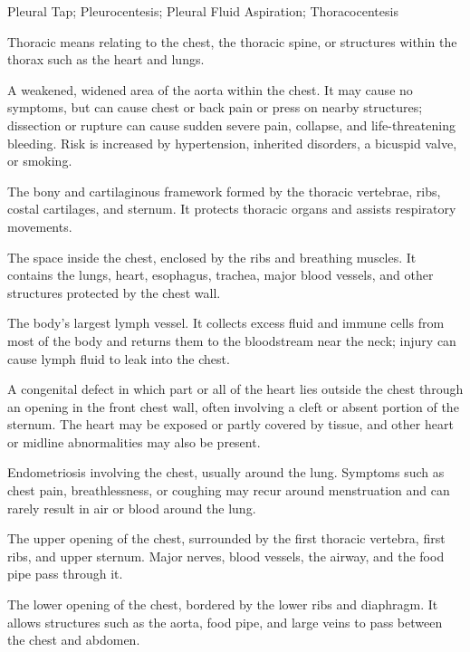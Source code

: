\synonyms
Pleural Tap; Pleurocentesis; Pleural Fluid Aspiration; Thoracocentesis

 Thoracic means relating to the chest, the thoracic spine, or structures within the thorax such as the heart and lungs.

 A weakened, widened area of the aorta within the chest. It may cause no symptoms, but can cause chest or back pain or press on nearby structures; dissection or rupture can cause sudden severe pain, collapse, and life-threatening bleeding. Risk is increased by hypertension, inherited disorders, a bicuspid valve, or smoking.

 The bony and cartilaginous framework formed by the thoracic vertebrae, ribs, costal
cartilages, and sternum. It protects thoracic organs and assists respiratory movements.

 The space inside the chest, enclosed by the ribs and breathing muscles. It contains the lungs, heart, esophagus, trachea, major blood vessels, and other structures protected by the chest wall.

 The body’s largest lymph vessel. It collects excess fluid and immune cells from most of the body and returns them to the bloodstream near the neck; injury can cause lymph fluid to leak into the chest.

 A congenital defect in which part or all of the heart lies outside the chest through an opening in the front chest wall, often involving a cleft or absent portion of the sternum. The heart may be exposed or partly covered by tissue, and other heart or midline abnormalities may also be present.

 Endometriosis involving the chest, usually around the lung. Symptoms such as chest pain, breathlessness, or coughing may recur around menstruation and can rarely result in air or blood around the lung.

 The upper opening of the chest, surrounded by the first thoracic vertebra, first ribs, and upper sternum. Major nerves, blood vessels, the airway, and the food pipe pass through it.

 The lower opening of the chest, bordered by the lower ribs and diaphragm. It allows structures such as the aorta, food pipe, and large veins to pass between the chest and abdomen.

